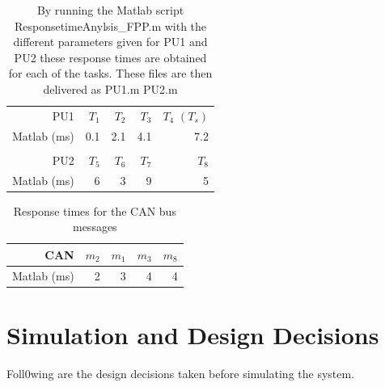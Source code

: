 \begin{table}[htbp]
	\centering
	\caption{By running the Matlab script ResponsetimeAnylsis\_FPP.m with the different parameters given for PU1 and PU2 these response times are obtained for each of the tasks. These files are then delivered as PU1.m PU2.m}
	\begin{tabular}{rrrrr}
		& & & & \\
		\toprule
		PU1     & $T_1$    & $T_2$    & $T_3$    & $T_4$  $(T_s)$ \\
		\midrule
		Matlab (ms)      & 0.1     & 2.1     & 4.1     & 7.2 \\
		
		& & & & \\
		\toprule
		PU2     & $T_5$    & $T_6$    & $T_7$    & $T_8$ \\
		\midrule
			Matlab (ms)      & 6       & 3       & 9       & 5 \\
		
	\end{tabular}%
	\label{tab:pu-rt}%
\end{table}%




\begin{table}[htbp]
	\centering
	\caption{Response times for the CAN bus messages}
	\begin{tabular}{rrrrr}
		\toprule
		CAN     & $m_2$   & $m_1$   & $m_3$   & $m_8$ \\
		\midrule
		Matlab (ms) & 2       & 3       & 4       & 4 \\
		
	\end{tabular}%
	\label{tab:can-rt}%
\end{table}%



\section{Simulation and Design Decisions}
Foll0wing are the design decisions taken before simulating the system.

